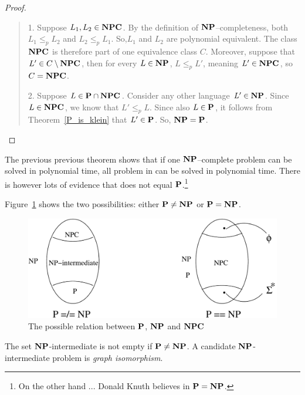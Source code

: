 \begin{proof} ~~
\begin{verse}
1. Suppose $L_1,L_2\in\NPC$. By the definition of $\NP$--completeness,
both $L_1 \leq_p L_2$ and $L_2 \leq_p L_1$. So,$L_1$ and $L_2$ are
polynomial equivalent. The class $\NPC$ is therefore part of one
equivalence class $C$. Moreover, suppose that $L' \in C\setminus \NPC$,
then for every $L\in\NP$, $L \leq_p L'$, meaning $L' \in \NPC$, so $C = \NPC$.


2. Suppose $L\in\P \cap\NPC$. Consider any other language $L'\in
\NP$. Since $L\in\NPC$, we know that $L' \leq_p L$. Since also
$L\in\P$, it follows from Theorem~\ref{P_is_klein} that $L'\in
\P$. So, $\NP=\P$.
\end{verse}
\end{proof}

The previous previous theorem shows that if one $\NP$--complete
problem can be solved in polynomial time, all problem in \NP can be
solved in polynomial time. There is however lots of evidence that \NP
does not equal $\P$.\footnote{On the other hand ... Donald Knuth
believes in $\P = \NP$.}

Figure~\ref{NP-venn} shows the two possibilities: either $\P \neq \NP$
or $\P = \NP$.

\begin{figure}[ht]
\begin{center}
\includegraphics[width=0.7\linewidth,keepaspectratio]{NP-venn}
\end{center}
\caption{The possible relation between $\P$, $\NP$ and $\NPC$
 \label{NP-venn}}
\end{figure}
The set $\NP$-intermediate is not empty if $\P \neq \NP$. A candidate
$\NP$-intermediate problem is {\em graph isomorphism}.


